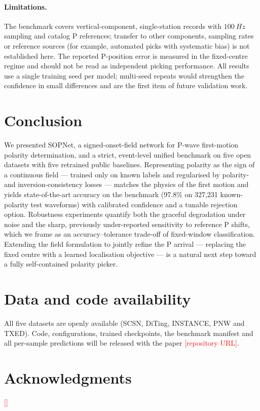 \documentclass[11pt]{article}
\newcommand{\TBD}[1]{\textcolor{red}{[#1]}}
\begin{document}
\paragraph{Limitations.}
The benchmark covers vertical-component, single-station records with
$\SI{100}{Hz}$ sampling and catalog P references; transfer to other
components, sampling rates or reference sources (for example, automated picks
with systematic bias) is not established here. The reported P-position error
is measured in the fixed-centre regime and should not be read as independent
picking performance. All results use a single training seed per model;
multi-seed repeats would strengthen the confidence in small differences and
are the first item of future validation work.

\section{Conclusion}
\label{sec:conclusion}

We presented SOPNet, a signed-onset-field network for P-wave first-motion
polarity determination, and a strict, event-level unified benchmark on five
open datasets with five retrained public baselines. Representing polarity as
the sign of a continuous field --- trained only on known labels and regularised
by polarity- and inversion-consistency losses --- matches the physics of the
first motion and yields state-of-the-art accuracy on the benchmark
(97.8\% on 327{,}231 known-polarity test waveforms) with calibrated
confidence and a tunable rejection option. Robustness experiments quantify
both the graceful degradation under noise and the sharp, previously
under-reported sensitivity to reference P shifts, which we frame as an
accuracy--tolerance trade-off of fixed-window classification. Extending the
field formulation to jointly refine the P arrival --- replacing the fixed
centre with a learned localisation objective --- is a natural next step toward
a fully self-contained polarity picker.

\section*{Data and code availability}
All five datasets are openly available (SCSN, DiTing, INSTANCE, PNW and
TXED). Code, configurations, trained checkpoints, the benchmark manifest and
all per-sample predictions will be released with the paper
\TBD{repository URL}.

\section*{Acknowledgments}
\TBD{}



\end{document}
